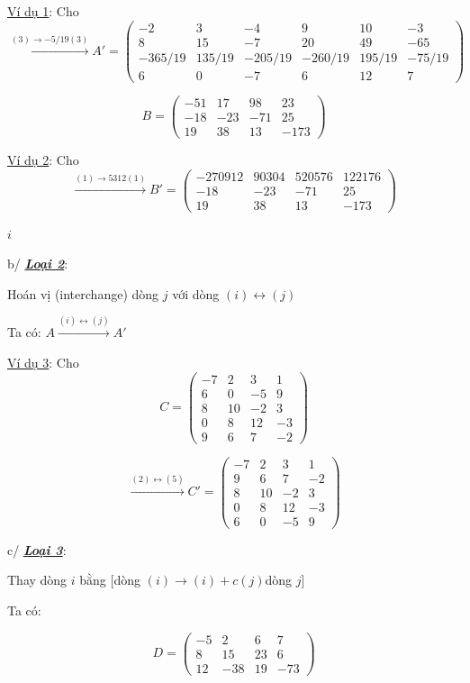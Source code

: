 \documentclass[12pt,a4paper]{article}
\let\ul\uline
\begin{document}
\ul{Ví dụ 1}: Cho $$\xrightarrow{(3) \rightarrow -5/19(3)} A' = \begin{pmatrix} -2 & 3 & -4 & 9 & 10 & -3 \\ 8 & 15 & -7 & 20 & 49 & -65 \\ -365/19 & 135/19 & -205/19 & -260/19 & 195/19 & -75/19 \\ 6 & 0 & -7 & 6 & 12 & 7 \end{pmatrix}$$

$$B = \begin{pmatrix} -51 & 17 & 98 & 23 \\ -18 & -23 & -71 & 25 \\ 19 & 38 & 13 & -173 \end{pmatrix}$$

\ul{Ví dụ 2}: Cho $$\xrightarrow{(1) \rightarrow 5312(1)} B' = \begin{pmatrix} -270912 & 90304 & 520576 & 122176 \\ -18 & -23 & -71 & 25 \\ 19 & 38 & 13 & -173 \end{pmatrix}$$

$i$

b/ \emph{\textbf{\ul{Loại 2}}}:

Hoán vị (interchange) dòng $j$ với dòng
$(i) \leftrightarrow (j)$

Ta có: $A \xrightarrow{(i) \leftrightarrow (j)} A'$

\ul{Ví dụ 3}: Cho $$C = \begin{pmatrix} -7 & 2 & 3 & 1 \\ 6 & 0 & -5 & 9 \\ 8 & 10 & -2 & 3 \\ 0 & 8 & 12 & -3 \\ 9 & 6 & 7 & -2 \end{pmatrix}$$

$$\xrightarrow{(2) \leftrightarrow (5)} C' = \begin{pmatrix} -7 & 2 & 3 & 1 \\ 9 & 6 & 7 & -2 \\ 8 & 10 & -2 & 3 \\ 0 & 8 & 12 & -3 \\ 6 & 0 & -5 & 9 \end{pmatrix}$$

c/ \emph{\textbf{\ul{Loại 3}}}:

Thay dòng $i$ bằng {[}dòng
$(i) \rightarrow (i) + c(j)$dòng
$j${]}

Ta có:

$$D = \begin{pmatrix} -5 & 2 & 6 & 7 \\ 8 & 15 & 23 & 6 \\ 12 & -38 & 19 & -73 \end{pmatrix}$$
\end{document}

